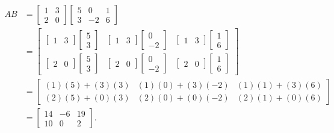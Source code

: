 \documentclass{article}
\begin{document}
    \begin{align*}
    AB &= 
    \begin{bmatrix}
        1 & 3 \\
        2 & 0
    \end{bmatrix}
    \begin{bmatrix}
        5 & 0 & 1 \\
        3 & -2 & 6 
    \end{bmatrix} \\
    &=
    \begin{bmatrix}
        \begin{bmatrix} 1 & 3 \end{bmatrix} \begin{bmatrix} 5 \\ 3 \end{bmatrix} & \begin{bmatrix} 1 & 3 \end{bmatrix} \begin{bmatrix} 0 \\ -2 \end{bmatrix} & \begin{bmatrix} 1 & 3 \end{bmatrix} \begin{bmatrix} 1 \\ 6 \end{bmatrix} \\
        \begin{bmatrix} 2 & 0 \end{bmatrix} \begin{bmatrix} 5 \\ 3 \end{bmatrix} & \begin{bmatrix} 2 & 0 \end{bmatrix} \begin{bmatrix} 0 \\ -2 \end{bmatrix} & \begin{bmatrix} 2 & 0 \end{bmatrix} \begin{bmatrix} 1 \\ 6 \end{bmatrix}
    \end{bmatrix} \\
    &=
    \begin{bmatrix}
        (1)(5) + (3)(3) & (1)(0) + (3)(-2) & (1)(1) + (3)(6) \\
        (2)(5) + (0)(3) & (2)(0) + (0)(-2) & (2)(1) + (0)(6)
    \end{bmatrix} \\
    &=
    \begin{bmatrix}
        14 & -6 & 19 \\
        10 & 0 & 2
    \end{bmatrix}.
    \end{align*}
\end{document}
